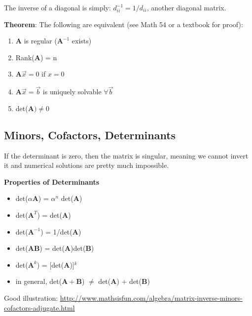 \documentclass[12pt]{article}
\newcommand{\ve}[1]{\ensuremath{\mathbf{#1}}}
\begin{document}
The inverse of a diagonal is simply: $d_{ii}^{-1} = 1/d_{ii}$, another diagonal matrix.

\textbf{Theorem}: The following are equivalent (see Math 54 or a textbook for proof):
%
\begin{enumerate}
\item $\ve{A}$ is regular ($\ve{A}^{-1}$ exists)
\item Rank($\ve{A}$) = n
\item $\ve{A}\vec{x} = 0$ if $x=0$
\item $\ve{A}\vec{x} = \vec{b}$ is uniquely solvable $\forall \vec{b}$
\item det($\ve{A}) \neq 0$
\end{enumerate}

\subsection*{Minors, Cofactors, Determinants}
If the determinant is zero, then the matrix is singular, meaning we cannot invert it and numerical solutions are pretty much impossible.

\textbf{Properties of Determinants}
\begin{itemize}
\item det($\alpha\ve{A}$) = $\alpha^n$ det($\ve{A}$)

\item det($\ve{A}^T$) = det($\ve{A}$)

\item det($\ve{A}^{-1}$) = 1/det($\ve{A}$)

\item det($\ve{AB}$) = det($\ve{A}$)det($\ve{B}$)

\item det($\ve{A}^k$) = [det($\ve{A}$)]$^k$

\item in general, det($\ve{A + B}$) $\neq$ det($\ve{A}$) + det($\ve{B}$) 
\end{itemize}

Good illustration: \href{http://www.mathsisfun.com/algebra/matrix-inverse-minors-cofactors-adjugate.html}{http://www.mathsisfun.com/algebra/matrix-inverse-minors-cofactors-adjugate.html}

\end{document}
